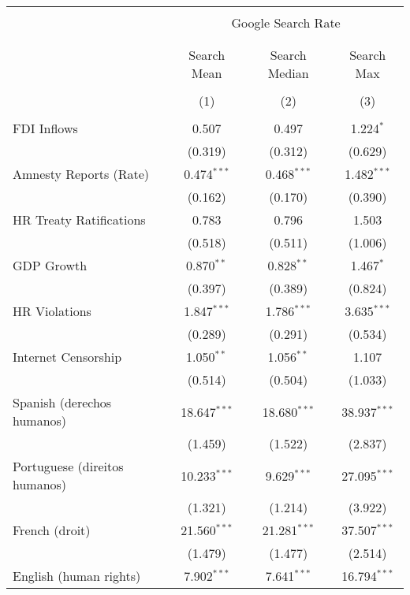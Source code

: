 
\begin{table}[!htbp] \centering 
  \caption{} 
  \label{} 
\begin{tabular}{@{\extracolsep{5pt}}lccc} 
\\[-1.8ex]\hline 
\hline \\[-1.8ex] 
 & \multicolumn{3}{c}{Google Search Rate} \\ 
\cline{2-4} 
\\[-1.8ex] & \multicolumn{3}{c}{ } \\ 
 & Search Mean & Search Median & Search Max \\ 
\\[-1.8ex] & (1) & (2) & (3)\\ 
\hline \\[-1.8ex] 
 FDI Inflows & 0.507 & 0.497 & 1.224$^{*}$ \\ 
  & (0.319) & (0.312) & (0.629) \\ 
  Amnesty Reports (Rate) & 0.474$^{***}$ & 0.468$^{***}$ & 1.482$^{***}$ \\ 
  & (0.162) & (0.170) & (0.390) \\ 
  HR Treaty Ratifications & 0.783 & 0.796 & 1.503 \\ 
  & (0.518) & (0.511) & (1.006) \\ 
  GDP Growth & 0.870$^{**}$ & 0.828$^{**}$ & 1.467$^{*}$ \\ 
  & (0.397) & (0.389) & (0.824) \\ 
  HR Violations & 1.847$^{***}$ & 1.786$^{***}$ & 3.635$^{***}$ \\ 
  & (0.289) & (0.291) & (0.534) \\ 
  Internet Censorship & 1.050$^{**}$ & 1.056$^{**}$ & 1.107 \\ 
  & (0.514) & (0.504) & (1.033) \\ 
  Spanish (derechos humanos) & 18.647$^{***}$ & 18.680$^{***}$ & 38.937$^{***}$ \\ 
  & (1.459) & (1.522) & (2.837) \\ 
  Portuguese (direitos humanos) & 10.233$^{***}$ & 9.629$^{***}$ & 27.095$^{***}$ \\ 
  & (1.321) & (1.214) & (3.922) \\ 
  French (droit) & 21.560$^{***}$ & 21.281$^{***}$ & 37.507$^{***}$ \\ 
  & (1.479) & (1.477) & (2.514) \\ 
  English (human rights) & 7.902$^{***}$ & 7.641$^{***}$ & 16.794$^{***}$ \\ 

\end{tabular}
\end{table}
